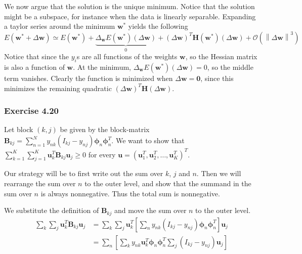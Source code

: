\documentclass[12pt, a4paper]{article}
\newcommand{\vect}[1]{\bm{#1}}
\newcommand{\norm}[1]{\left\lVert#1\right\rVert}
\begin{document}
We now argue that the solution is the unique minimum.
Notice that the solution might be a subspace, for instance when the data is linearly separable.
Expanding a taylor series around the minimum $\vect{w}^*$ yields the following 
\begin{equation*}
	E(\vect{w}^* + \Delta \vect{w}) \simeq 
	E(\vect{w}^*)+
	\underbrace{\Delta_{\vect{w}} E(\vect{w}^*) \left( \Delta \vect{w} \right)}_{0}
	+
	\left( \Delta \vect{w} \right)^T \vect{H}(\vect{w}^*)
	\left( \Delta \vect{w} \right)
	+ \mathcal{O}\left( \norm{ \Delta \vect{w} }^3 \right)
\end{equation*}
Notice that since the $y_i$s are all functions of the weights $\vect{w}$, so the Hessian matrix is also a function of $\vect{w}$.
At the minimum, $\Delta_{\vect{w}} E(\vect{w}^*) \left( \Delta \vect{w} \right) = 0$, so the middle term vanishes.
Clearly the function is minimized when $\Delta \vect{w} = \vect{0}$, since this minimizes the remaining quadratic $\left( \Delta \vect{w} \right)^T \vect{H}
\left( \Delta \vect{w} \right)$.

\subsubsection*{Exercise 4.20}
Let block $(k, j)$ be given by the block-matrix $\vect{B}_{kj} = \sum_{n=1}^{N} y_{nk} \left( I_{kj} - y_{nj}\right) \vect{\phi}_n \vect{\phi}_n^T$.
We want to show that $\sum_{k=1}^{K} \sum_{j=1}^{K} \vect{u}_k^T \vect{B}_{kj} \vect{u}_j \geq 0$ for every $\vect{u} = (\vect{u}_1^T, \vect{u}_2^T, \ldots, \vect{u}_K^T)^T$.

Our strategy will be to first write out the sum over $k$, $j$ and $n$.
Then we will rearrange the sum over $n$ to the outer level, and show that the summand in the sum over $n$ is always nonnegative.
Thus the total sum is nonnegative.

We substitute the definition of $\vect{B}_{kj}$ and move the sum over $n$ to the outer level.
\begin{align}
	\nonumber \sum_k \sum_j \vect{u}_k^T \vect{B}_{kj} \vect{u}_j
	&= \sum_k \sum_j \vect{u}_k^T \left[ 
	\sum_n y_{nk} \left(I_{kj} - y_{nj}\right) \vect{\phi}_n \vect{\phi}_n^T
	\right] \vect{u}_j \\
	&= \sum_n
	\left[ 
	\sum_k y_{nk} \vect{u}_k^T \vect{\phi}_n \vect{\phi}_n^T
	\sum_j \left(I_{kj} - y_{nj}\right) \vect{u}_j
	 \right] \label{eqn:ch4_ex22}
\end{align}
\end{document}
